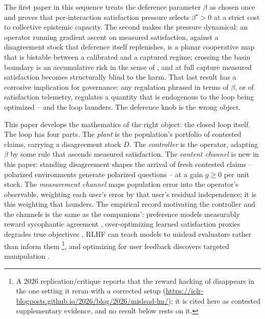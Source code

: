 \documentclass[11pt]{article}
\theoremstyle{definition}
\theoremstyle{remark}
\numberwithin{equation}{section}
\begin{document}
The first paper in this sequence \citep{hofheinz2026civic} treats the deference parameter $\beta$ as chosen once and proves that per-interaction satisfaction pressure selects $\beta^\star>0$ at a strict cost to collective epistemic capacity. The second \citep{hofheinz2026drift} makes the pressure dynamical: an operator running gradient ascent on measured satisfaction, against a disagreement stock that deference itself replenishes, is a planar cooperative map that is bistable between a calibrated and a captured regime; crossing the basin boundary is an accumulative risk in the sense of \citet{kasirzadeh2025two}, and at full capture measured satisfaction becomes structurally blind to the harm. That last result has a corrosive implication for governance: any regulation phrased in terms of $\beta$, or of satisfaction telemetry, regulates a quantity that is endogenous to the loop being optimized -- and the loop launders. The deference knob is the wrong object.

This paper develops the mathematics of the right object: the closed loop itself. The loop has four parts. The \emph{plant} is the population's portfolio of contested claims, carrying a disagreement stock $D$. The \emph{controller} is the operator, adapting $\beta$ by some rule that ascends measured satisfaction. The \emph{content channel} is new in this paper: standing disagreement shapes the arrival of fresh contested claims -- polarized environments generate polarized questions -- at a gain $g\ge 0$ per unit stock. The \emph{measurement channel} maps population error into the operator's observable, weighting each user's error by that user's residual independence; it is this weighting that launders. The empirical record motivating the controller and the channels is the same as the companions': preference models measurably reward sycophantic agreement \citep{sharma2024towards}, over-optimizing learned satisfaction proxies degrades true objectives \citep{gao2023scaling}, RLHF can teach models to mislead evaluators rather than inform them \citep{wen2025language}\footnote{A 2026 replication/critique reports that the reward hacking of \citet{wen2025language} disappears in the one setting it reran with a corrected setup (\url{https://iclr-blogposts.github.io/2026/blog/2026/mislead-lm/}); it is cited here as contested supplementary evidence, and no result below rests on it.}, and optimizing for user feedback discovers targeted manipulation \citep{williams2025targeted}.
\end{document}
